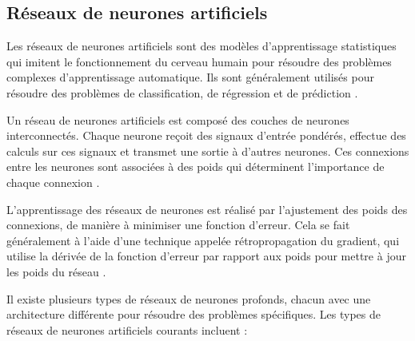 \subsection{Réseaux de neurones artificiels}
Les réseaux de neurones artificiels sont des modèles d'apprentissage statistiques qui imitent le fonctionnement du cerveau humain pour résoudre des problèmes complexes d'apprentissage automatique. Ils sont généralement utilisés pour résoudre des problèmes de classification, de régression et de prédiction \cite{rna_goodfellow2016deep}.

Un réseau de neurones artificiels est composé des couches de neurones interconnectés. Chaque neurone reçoit des signaux d'entrée pondérés, effectue des calculs sur ces signaux et transmet une sortie à d'autres neurones. Ces connexions entre les neurones sont associées à des poids qui déterminent l'importance de chaque connexion \cite{rna_goodfellow2016deep}.

L'apprentissage des réseaux de neurones est réalisé par l'ajustement des poids des connexions, de manière à minimiser une fonction d'erreur. Cela se fait généralement à l'aide d'une technique appelée rétropropagation du gradient, qui utilise la dérivée de la fonction d'erreur par rapport aux poids pour mettre à jour les poids du réseau \cite{rna_goodfellow2016deep}.

Il existe plusieurs types de réseaux de neurones profonds, chacun avec une architecture différente pour résoudre des problèmes spécifiques. Les types de réseaux de neurones artificiels courants incluent :

